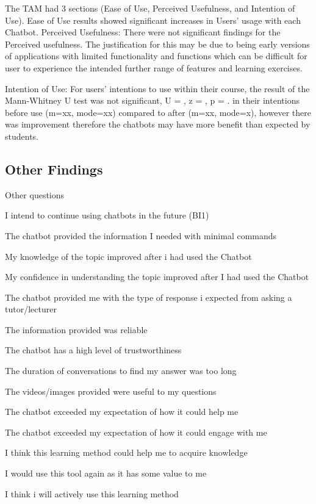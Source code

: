 \documentclass[a4paper, nobind]{templates/ociamthesis}
\begin{document}
The TAM had 3 sections (Ease of Use, Perceived Usefulness, and Intention
of Use). Ease of Use results showed significant increases in Users'
usage with each Chatbot. Perceived Usefulness: There were not
significant findings for the Perceived usefulness. The justification for
this may be due to being early versions of applications with limited
functionality and functions which can be difficult for user to
experience the intended further range of features and learning
exercises.

Intention of Use: For users' intentions to use within their course, the
result of the Mann-Whitney U test was not significant, U = , z = , p = .
in their intentions before use (m=xx, mode=xx) compared to after (m=xx,
mode=x), however there was improvement therefore the chatbots may have
more benefit than expected by students.

\hypertarget{other-findings}{%
\subsection{Other Findings}\label{other-findings}}

Other questions

I intend to continue using chatbots in the future (BI1)

The chatbot provided the information I needed with minimal commands

My knowledge of the topic improved after i had used the Chatbot

My confidence in understanding the topic improved after I had used the
Chatbot

The chatbot provided me with the type of response i expected from asking
a tutor/lecturer

The information provided was reliable

The chatbot has a high level of trustworthiness

The duration of conversations to find my answer was too long

The videos/images provided were useful to my questions

The chatbot exceeded my expectation of how it could help me

The chatbot exceeded my expectation of how it could engage with me

I think this learning method could help me to acquire knowledge

I would use this tool again as it has some value to me

I think i will actively use this learning method
\end{document}

